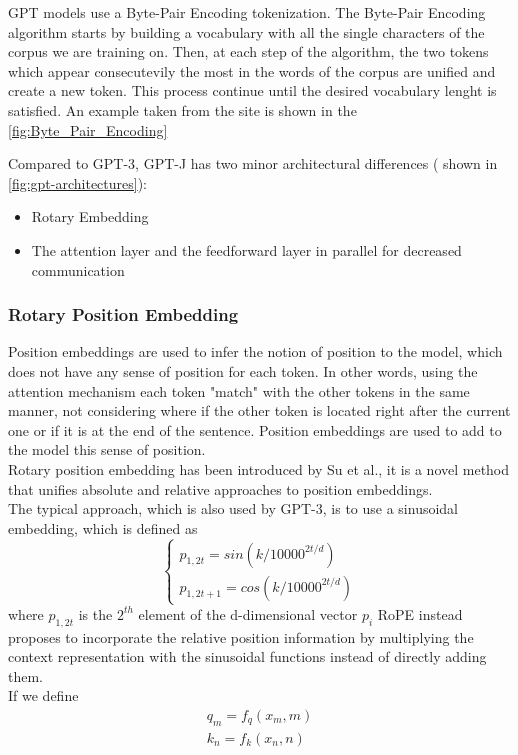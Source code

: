 GPT models use a Byte-Pair Encoding tokenization. The Byte-Pair Encoding algorithm starts by building a vocabulary with all the single characters of the corpus we are training on. Then, at each step of the algorithm, the two tokens which appear consecutevily the most in the words of the corpus are unified and create a new token. This process continue until the desired vocabulary lenght is satisfied. An example taken from the site \cite{byte-pair-encoding} is shown in the \autoref{fig:Byte_Pair_Encoding}


Compared to GPT-3, GPT-J\cite{gptj} has two minor architectural differences  ( shown in \autoref{fig:gpt-architectures}):
\begin{itemize}
    \item Rotary Embedding
    \item The attention layer and the feedforward layer in parallel for decreased communication
\end{itemize}

\subsubsection{Rotary Position Embedding}
Position embeddings are used to infer the notion of position to the model, which does not have any sense of position for each token. In other words, using the attention mechanism each token "match" with the other tokens in the same manner, not considering where if the other token is located right after the current one or if it is at the end of the sentence. Position embeddings are used to add to the model this sense of position. \\ Rotary position embedding has been introduced by Su et al.\cite{su2021roformer}, it is a novel method that unifies absolute and relative approaches to position embeddings. \\
The typical approach, which is also used by GPT-3, is to use a sinusoidal embedding, which is defined as
\begin{equation*}
    \begin{cases}
        p_{1,2t} = sin(k/10000^{2t/d}) \\
        p_{1,2t+1} = cos(k/10000^{2t/d}) 
    \end{cases}
\end{equation*}
where $p_{1,2t}$ is the $2^{th}$ element of the d-dimensional vector $p_i$
RoPE instead proposes to incorporate the relative position information by multiplying the context representation with the sinusoidal functions instead of directly adding them. \\
If we define 
\begin{equation*}
    \begin{split}
        q_m = f_q(x_m, m) \\
        k_n = f_k(x_n, n) 
    \end{split}    
\end{equation*}

